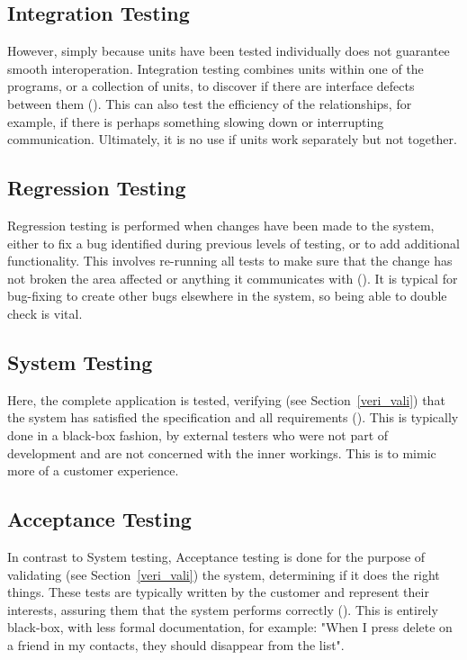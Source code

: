 \documentclass[12pt]{article}
\begin{document}
\subsection{Integration Testing}

However, simply because units have been tested individually does not guarantee smooth interoperation. Integration testing combines units within one of the programs, or a collection of units, to discover if there are interface defects between them (). This can also test the efficiency of the relationships, for example, if there is perhaps something slowing down or interrupting communication. Ultimately, it is no use if units work separately but not together.


\subsection{Regression Testing}

Regression testing is performed when changes have been made to the system, either to fix a bug identified during previous levels of testing, or to add additional functionality. This involves re-running all tests to make sure that the change has not broken the area affected or anything it communicates with (). It is typical for bug-fixing to create other bugs elsewhere in the system, so being able to double check is vital.


\subsection{System Testing}

Here, the complete application is tested, verifying (see Section~\ref{veri_vali}) that the system has satisfied the specification and all requirements (). This is typically done in a black-box fashion, by external testers who were not part of development and are not concerned with the inner workings. This is to mimic more of a customer experience.


\subsection{Acceptance Testing}

In contrast to System testing, Acceptance testing is done for the purpose of validating (see Section~\ref{veri_vali}) the system, determining if it does the right things. These tests are typically written by the customer and represent their interests, assuring them that the system performs correctly (). This is entirely black-box, with less formal documentation, for example: "When I press delete on a friend in my contacts, they should disappear from the list".
\end{document}
